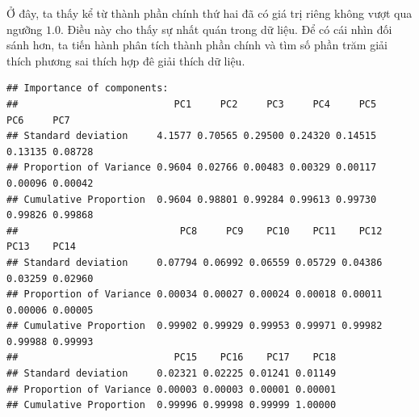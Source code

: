 \documentclass[../thesis.tex]{subfiles}
\begin{document}
Ở đây, ta thấy kể từ thành phần chính thứ hai đã có giá trị riêng không vượt qua ngưỡng $ 1.0 $. Điều này cho thấy sự nhất quán trong dữ liệu. Để có cái nhìn đối sánh hơn, ta tiến hành phân tích thành phần chính và tìm số phần trăm giải thích phương sai thích hợp đê giải thích dữ liệu.

\newpage
\begin{Shaded}
	\begin{Highlighting}[]
  \NormalTok{, } \NormalTok{) }\SpecialCharTok{\%\textgreater{}\%} 
		\NormalTok{()}
	\end{Highlighting}
\end{Shaded}

\begin{verbatim}
## Importance of components:
##                           PC1     PC2     PC3     PC4     PC5     PC6     PC7
## Standard deviation     4.1577 0.70565 0.29500 0.24320 0.14515 0.13135 0.08728
## Proportion of Variance 0.9604 0.02766 0.00483 0.00329 0.00117 0.00096 0.00042
## Cumulative Proportion  0.9604 0.98801 0.99284 0.99613 0.99730 0.99826 0.99868
##                            PC8     PC9    PC10    PC11    PC12    PC13    PC14
## Standard deviation     0.07794 0.06992 0.06559 0.05729 0.04386 0.03259 0.02960
## Proportion of Variance 0.00034 0.00027 0.00024 0.00018 0.00011 0.00006 0.00005
## Cumulative Proportion  0.99902 0.99929 0.99953 0.99971 0.99982 0.99988 0.99993
##                           PC15    PC16    PC17    PC18
## Standard deviation     0.02321 0.02225 0.01241 0.01149
## Proportion of Variance 0.00003 0.00003 0.00001 0.00001
## Cumulative Proportion  0.99996 0.99998 0.99999 1.00000
\end{verbatim}

\begin{Shaded}
	\begin{Highlighting}[]
 \NormalTok{) }\SpecialCharTok{\%\textgreater{}\%} 
		\NormalTok{()}
	\end{Highlighting}
\end{Shaded}
\end{document}

